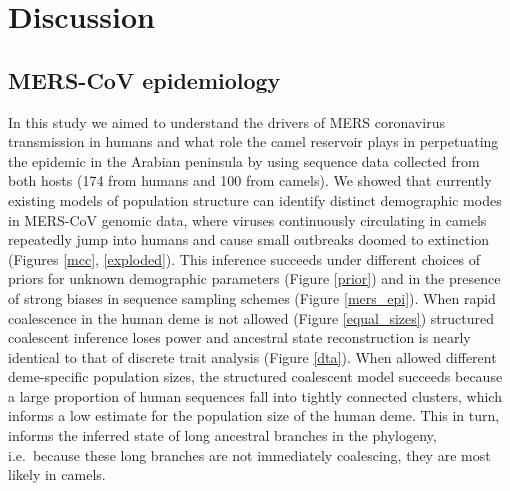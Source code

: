\documentclass[9pt,lineno]{elife}
\def\lmc#1{\textcolor{green}{[#1]}}
\begin{document}
\section*{Discussion}

\subsection*{MERS-CoV epidemiology}
In this study we aimed to understand the drivers of MERS coronavirus transmission in humans and what role the camel reservoir plays in perpetuating the epidemic in the Arabian peninsula by using sequence data collected from both hosts (174 from humans and 100 from camels).
We showed that currently existing models of population structure \citep{vaughan_efficient_2014} can identify distinct demographic modes in MERS-CoV genomic data, where viruses continuously circulating in camels repeatedly jump into humans and cause small outbreaks doomed to extinction (Figures \ref{mcc}, \ref{exploded}).
This inference succeeds under different choices of priors for unknown demographic parameters (Figure \ref{prior}) and in the presence of strong biases in sequence sampling schemes (Figure \ref{mers_epi}).
When rapid coalescence in the human deme is not allowed (Figure \ref{equal_sizes}) structured coalescent inference loses power and ancestral state reconstruction is nearly identical to that of discrete trait analysis (Figure \ref{dta}).
When allowed different deme-specific population sizes, the structured coalescent model succeeds because a large proportion of human sequences fall into tightly connected clusters, which informs a low estimate for the population size of the human deme.
This in turn, informs the inferred state of long ancestral branches in the phylogeny, i.e.\ because these long branches are not immediately coalescing, they are most likely in camels.
\end{document}
